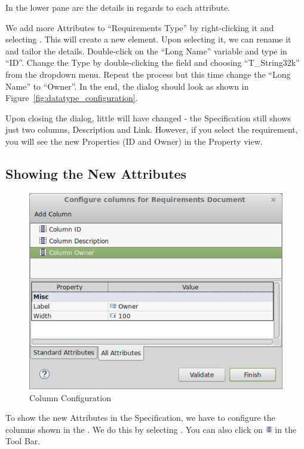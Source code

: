 In the lower pane are the details in regards to each attribute.

We add more Attributes to ``Requirements Type'' by right-clicking it and selecting .  This will create a new element.  Upon selecting it, we can rename it and tailor the details.  Double-click on the ``Long Name'' variable and type in ``ID''.  Change the Type by double-clicking the field and choosing ``T\_String32k'' from the dropdown menu.  Repeat the process but this time change the ``Long Name'' to ``Owner''.  In the end, the dialog should look as shown in Figure~\ref{fig:datatype_configuration}.

Upon closing the dialog, little will have changed - the Specification still shows just two columns, Description and Link.  However, if you select the requirement, you will see the new Properties (ID and Owner) in the Property view.

\subsection{Showing the New Attributes}

\begin{figure}
\centering      
\includegraphics[width=0.8\linewidth]{../rmf-images/columnconfig.png}      
\caption{Column Configuration}
\label{fig:column_configuration}
\end{figure}

To show the new Attributes in the Specification, we have to configure the columns shown in the .  We do this by selecting .  You can also click on \includegraphics[height=0.8em]{../rmf-images/icons/full/obj16/Column.png} in the Tool Bar.

